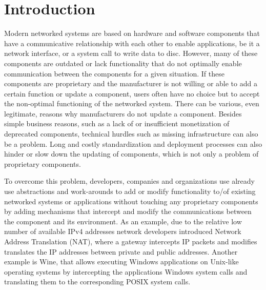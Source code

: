 \section{Introduction}
\label{sec:intro}







Modern networked systems are based on hardware and software components that have a communicative relationship with each other to enable applications, be it a network interface, or a system call to write data to disc.
However, many of these components are outdated or lack functionality that do not optimally enable communication between the components for a given situation.
If these components are proprietary and the manufacturer is not willing or able to add a certain function or update a component, users often have no choice but to accept the non-optimal functioning of the networked system.
There can be various, even legitimate, reasons why manufacturers do not update a component.
Besides simple business reasons, such as a lack of or insufficient monetization of deprecated components, technical hurdles such as missing infrastructure can also be a problem.
Long and costly standardization and deployment processes can also hinder or slow down the updating of components, which is not only a problem of proprietary components.

To overcome this problem, developers, companies and organizations use already use abstractions and work-arounds to add or modify functionality to/of existing networked systems or applications without touching any proprietary components by adding mechanisms that intercept and modify the communications between the component and its environment.
As an example, due to the relative low number of available IPv4 addresses network developers introduced Network Address Translation (NAT), where a gateway intercepts IP packets and modifies translates the IP addresses between private and public addresses.
Another example is Wine, that allows executing Windows applications on Unix-like operating systems by intercepting the applications Windows system calls and translating them to the corresponding POSIX system calls.

